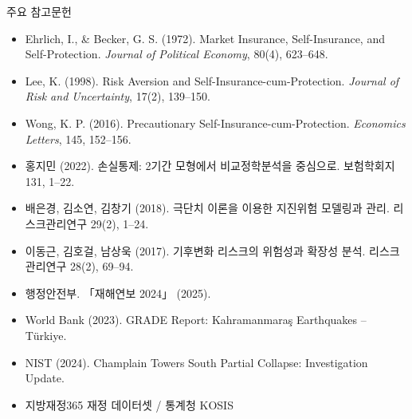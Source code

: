 \documentclass[aspectratio=169,10pt]{beamer}
\newcommand{\fb}[1]{{\fbfont #1}}
\begin{document}
\begin{frame}{주요 참고문헌}
  \scriptsize
  \begin{itemize}
    \item Ehrlich, I., \& Becker, G. S. (1972). Market Insurance, Self-Insurance, and Self-Protection. \textit{Journal of Political Economy}, 80(4), 623--648.
    \item Lee, K. (1998). Risk Aversion and Self-Insurance-cum-Protection. \textit{Journal of Risk and Uncertainty}, 17(2), 139--150.
    \item Wong, K. P. (2016). Precautionary Self-Insurance-cum-Protection. \textit{Economics Letters}, 145, 152--156.
    \item 홍지민 (2022). 손실통제: 2기간 모형에서 비교정학분석을 중심으로. 보험학회지 131, 1--22.
    \item 배은경, 김소연, 김창기 (2018). 극단치 이론을 이용한 지진위험 모델링과 관리. 리스크관리연구 29(2), 1--24.
    \item 이동근, 김호걸, 남상욱 (2017). 기후변화 리스크의 위험성과 확장성 분석. 리스크관리연구 28(2), 69--94.
    \item 행정안전부. 「재해연보 2024」 (2025).
    \item World Bank (2023). GRADE Report: Kahramanmara\fb{ş} Earthquakes -- T\fb{ü}rkiye.
    \item NIST (2024). Champlain Towers South Partial Collapse: Investigation Update.
    \item 지방재정365 재정 데이터셋 / 통계청 KOSIS
  \end{itemize}
\end{frame}
\end{document}
